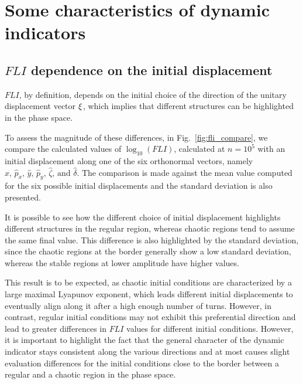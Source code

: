 \section{Some characteristics of dynamic indicators}\label{sec:8:features}

\subsection{$FLI$ dependence on the initial displacement}

$FLI$, by definition, depends on the initial choice of the direction of the unitary displacement vector $\vb{\xi}$, which implies that different structures can be highlighted in the phase space.

To assess the magnitude of these differences, in Fig.~\ref{fig:fli_compare}, we compare the calculated values of $\log_{10}({FLI})$, calculated at $n=10^5$ with an initial displacement along one of the six orthonormal vectors, namely $\hat{x},\,\hat{p}_x,\,\hat{y},\,\hat{p}_y,\,\hat{\zeta},\,\text{and }\hat{\delta}$. The comparison is made against the mean value computed for the six possible initial displacements and the standard deviation is also presented.

It is possible to see how the different choice of initial displacement highlights different structures in the regular region, whereas chaotic regions tend to assume the same final value. This difference is also highlighted by the standard deviation, since the chaotic regions at the border generally show a low standard deviation, whereas the stable regions at lower amplitude have higher values.

This result is to be expected, as chaotic initial conditions are characterized by a large maximal Lyapunov exponent, which leads different initial displacements to eventually align along it after a high enough number of turns. However, in contrast, regular initial conditions may not exhibit this preferential direction and lead to greater differences in $FLI$ values for different initial conditions. However, it is important to highlight the fact that the general character of the dynamic indicator stays consistent along the various directions and at most causes slight evaluation differences for the initial conditions close to the border between a regular and a chaotic region in the phase space.

